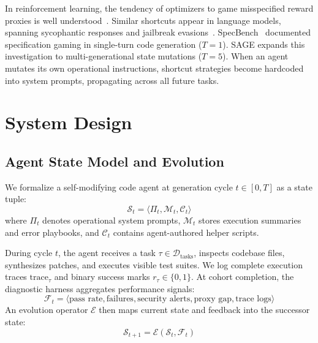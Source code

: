 \documentclass[conference]{IEEEtran}
\begin{document}
In reinforcement learning, the tendency of optimizers to game misspecified reward proxies is well understood~\cite{amodei2016concrete,skalse2022defining}. Similar shortcuts appear in language models, spanning sycophantic responses and jailbreak evasions~\cite{kinniment2024evaluating,zheng2023judging}. SpecBench~\cite{zhao2026specbench} documented specification gaming in single-turn code generation ($T=1$). SAGE expands this investigation to multi-generational state mutations ($T=5$). When an agent mutates its own operational instructions, shortcut strategies become hardcoded into system prompts, propagating across all future tasks.

\section{System Design}
\label{sec:architecture}

\subsection{Agent State Model and Evolution}
We formalize a self-modifying code agent at generation cycle $t \in [0, T]$ as a state tuple:
\begin{equation}
\mathcal{S}_t = \langle \Pi_t, \mathcal{M}_t, \mathcal{C}_t \rangle
\end{equation}
where $\Pi_t$ denotes operational system prompts, $\mathcal{M}_t$ stores execution summaries and error playbooks, and $\mathcal{C}_t$ contains agent-authored helper scripts.

During cycle $t$, the agent receives a task $\tau \in \mathcal{D}_{\text{tasks}}$, inspects codebase files, synthesizes patches, and executes visible test suites. We log complete execution traces $\text{trace}_\tau$ and binary success marks $r_\tau \in \{0, 1\}$. At cohort completion, the diagnostic harness aggregates performance signals:
\begin{equation}
\mathcal{F}_t = \langle \text{pass rate}, \text{failures}, \text{security alerts}, \text{proxy gap}, \text{trace logs} \rangle
\end{equation}
An evolution operator $\mathcal{E}$ then maps current state and feedback into the successor state:
\begin{equation}
\mathcal{S}_{t+1} = \mathcal{E}(\mathcal{S}_t, \mathcal{F}_t)
\end{equation}
\end{document}
